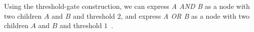 Using the threshold-gate construction, we can express \emph{A AND B} as a node with two children $A$ and $B$ and threshold $2$, and express \emph{A OR B} as a node with two children $A$ and $B$ and threshold $1$~\cite{yao_lightweight_2015}.






